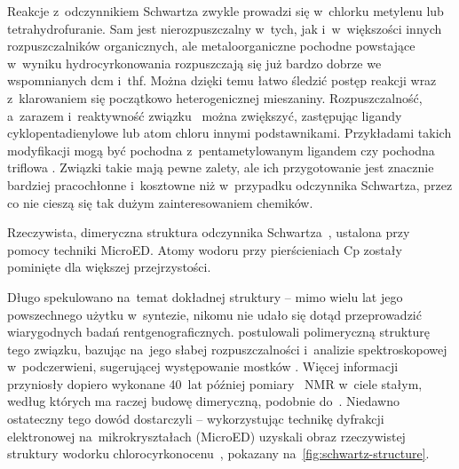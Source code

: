 Reakcje z~odczynnikiem Schwartza zwykle prowadzi się w~chlorku metylenu lub tetrahydrofuranie.
Sam \schwartz{} jest nierozpuszczalny w~tych, jak i~w~większości innych rozpuszczalników
  organicznych, ale metaloorganiczne pochodne powstające w~wyniku hydrocyrkonowania
  rozpuszczają się już bardzo dobrze we wspomnianych \acrshort{dcm} i~\acrshort{thf}.
Można dzięki temu łatwo śledzić postęp reakcji wraz z~klarowaniem się początkowo
  heterogenicznej mieszaniny.
Rozpuszczalność, a~zarazem i~reaktywność związku~ można zwiększyć,
  zastępując ligandy cyklopentadienylowe lub atom chloru innymi podstawnikami.
Przykładami takich modyfikacji mogą być pochodna z~pentametylowanym ligandem
  \ch{[(Cp^*)2Zr(H)Cl]} czy pochodna triflowa
  \ch{[Cp2Zr(H)OTf]}.
Związki takie mają pewne zalety, ale ich przygotowanie jest znacznie bardziej
  pracochłonne i~kosztowne niż w~przypadku odczynnika Schwartza,
  przez co nie cieszą się tak dużym zainteresowaniem chemików.

\begin{marginfigure}
  
  \caption{
    Rzeczywista, dimeryczna struktura odczynnika Schwartza~,
    ustalona przy pomocy techniki MicroED.
    Atomy wodoru przy pierścieniach Cp zostały pominięte dla większej przejrzystości.
  }
  \label{fig:schwartz-structure}
\end{marginfigure}
  Długo spekulowano na~temat dokładnej struktury \schwartz{} \---
  mimo wielu lat jego powszechnego użytku w~syntezie, nikomu nie udało się dotąd
  przeprowadzić wiarygodnych badań rentgenograficznych.
\citeauthor{wailes70} postulowali polimeryczną strukturę tego związku,
  bazując na~jego słabej rozpuszczalności i~analizie spektroskopowej w~podczerwieni,
  sugerującej występowanie mostków .
Więcej informacji przyniosły dopiero wykonane 40~lat później pomiary ~NMR
  w~ciele stałym, według których  ma raczej budowę dimeryczną,
  podobnie do~\ch{[Cp2Zr(H)Me]}.
Niedawno ostateczny tego dowód dostarczyli \citeauthor{jones19} \---
  wykorzystując technikę dyfrakcji elektronowej na~mikrokryształach (MicroED) uzyskali
  obraz rzeczywistej struktury wodorku chlorocyrkonocenu~,
  pokazany na~\cref{fig:schwartz-structure}.


